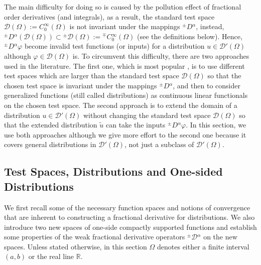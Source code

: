 \documentclass[leqno,final]{siamltex}
\numberwithin{equation}{section}
\renewcommand{\(}{\bigl(}
\renewcommand{\)}{\bigr)}
\newcommand{\R}{\mathbb{R}}
\begin{document}
The main difficulty for doing so is caused by the 
pollution effect of fractional order derivatives (and integrals), as a result,  the standard test space $\mathscr{D}(\Omega):=C^\infty_0(\Omega)$ is 
not invariant under the mappings ${^{\pm}}{D}{^{\alpha}}$, instead, ${^{\pm}}{D}{^{\alpha}}
(\mathscr{D}(\Omega)) \subset {^{\pm}}{\mathscr{D}(\Omega)}:= {^{\mp}}{C}{^{\infty}_{0}}(\Omega)$ 
(see the definitions below). 
Hence, ${^{\pm}}{D}{^{\alpha}} \varphi$ become invalid test functions (or inputs) for a distribution 
$u\in \mathscr{D}'(\Omega)$  although $\varphi \in \mathscr{D}(\Omega)$ is.  To circumvent this difficulty, 
there are two approaches used in the literature. The first one, which is most popular \cite{Samko}, is 
to use different test spaces which are larger than the standard test space $\mathscr{D}(\Omega)$ so that the chosen test space is invariant under  the mappings ${^{\pm}}{D}{^{\alpha}}$, and then to consider generalized functions (still called distributions) as continuous linear functionals on the chosen 
test space. The second approach is to extend the domain of a distribution  
$u\in \mathscr{D}'(\Omega)$ without changing the standard test space $\mathscr{D}(\Omega)$
so that the extended distribution $\tilde{u}$ can take the inputs ${^{\pm}}{D}{^{\alpha}} \varphi$. 
%
In this section, we use both approaches although we give more effort to the second one because it 
covers general distributions in $\mathscr{D}'(\Omega)$,  not just a subclass of $\mathscr{D}'(\Omega)$.   

\subsection{Test Spaces, Distributions and One-sided Distributions}\label{sec-6.1}
  We first recall some of the necessary function spaces and notions of convergence that are inherent to 
  constructing a fractional derivative for distributions. We also introduce two new  spaces of 
  one-side compactly supported functions and establish some properties of the weak fractional derivative operators ${^{\pm}}{\mathcal{D}}{^{\alpha}}$ 
  on the new spaces. Unless stated otherwise, in this section $\Omega$ denotes  
  either a finite interval $(a,b)$ or the real line $\R$.  
  
\end{document}
